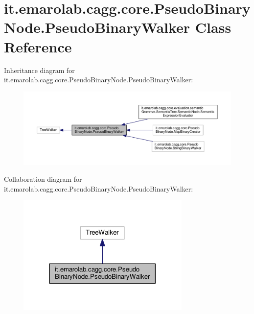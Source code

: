 \hypertarget{classit_1_1emarolab_1_1cagg_1_1core_1_1PseudoBinaryNode_1_1PseudoBinaryWalker}{\section{it.\-emarolab.\-cagg.\-core.\-Pseudo\-Binary\-Node.\-Pseudo\-Binary\-Walker Class Reference}
\label{classit_1_1emarolab_1_1cagg_1_1core_1_1PseudoBinaryNode_1_1PseudoBinaryWalker}
}


Inheritance diagram for it.\-emarolab.\-cagg.\-core.\-Pseudo\-Binary\-Node.\-Pseudo\-Binary\-Walker\-:\nopagebreak
\begin{figure}[H]
\begin{center}
\leavevmode
\includegraphics[width=350pt]{classit_1_1emarolab_1_1cagg_1_1core_1_1PseudoBinaryNode_1_1PseudoBinaryWalker__inherit__graph}
\end{center}
\end{figure}


Collaboration diagram for it.\-emarolab.\-cagg.\-core.\-Pseudo\-Binary\-Node.\-Pseudo\-Binary\-Walker\-:\nopagebreak
\begin{figure}[H]
\begin{center}
\leavevmode
\includegraphics[width=242pt]{classit_1_1emarolab_1_1cagg_1_1core_1_1PseudoBinaryNode_1_1PseudoBinaryWalker__coll__graph}
\end{center}
\end{figure}
